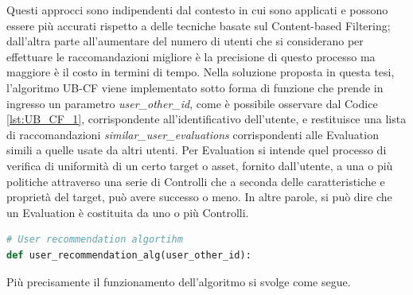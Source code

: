 %
Questi approcci sono indipendenti dal contesto in cui sono applicati e possono essere più accurati rispetto 
a delle tecniche basate sul Content-based Filtering; dall'altra parte all'aumentare del numero di utenti che si considerano per 
effettuare le raccomandazioni migliore è la precisione di questo processo ma maggiore è il costo in termini di tempo.\hfill\break
Nella soluzione proposta in questa tesi, l'algoritmo UB-CF viene implementato sotto forma di funzione che prende in ingresso un parametro 
\textit{user\_other\_id}, come è possibile osservare dal Codice \ref{lst:UB_CF_1}, corrispondente all'identificativo dell'utente, 
e restituisce una lista di raccomandazioni \textit{similar\_user\_evaluations} corrispondenti alle Evaluation simili a quelle usate 
da altri utenti.\hfill\break
Per Evaluation si intende quel processo di verifica di uniformità di un certo target o asset, fornito dall'utente, a una o più politiche 
attraverso una serie di Controlli che a seconda delle caratteristiche e proprietà del target, può avere successo o meno. In altre parole, 
si può dire che un Evaluation è costituita da uno o più Controlli.
\lstset{style=python_code_style}
\begin{lstlisting}[language=Python, label=lst:UB_CF_1, caption={\ }]
# User recommendation algortihm
def user_recommendation_alg(user_other_id):
\end{lstlisting}
%
Più precisamente il funzionamento dell'algoritmo si svolge come segue.
